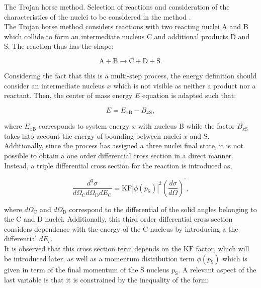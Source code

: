 \documentclass[openany]{book}
\begin{document}
The Trojan horse method. Selection of reactions and consideration of the characteristics of the nuclei to be considered in the method \cite{spitaleri_mukhamedzhanov_blokhintsev_cognata_pizzone_tumino_2011}. \\

The Trojan horse method considers reactions with two reacting nuclei A and B which collide to form an intermediate nucleus C and additional products D and S. The reaction thus has the shape:

\begin{equation}\label{eq:special_THM_reaction}
	\mathrm{A + B \rightarrow C + D + S}.
\end{equation}

Considering the fact that this is a multi-step process, the energy definition should consider an intermediate nucleus $x$ which is not visible as neither a product nor a reactant. Then, the center of mass energy $E$ equation is adapted such that: 

\begin{equation}\label{eq:special_THM_energy}
	E = E_{x\mathrm{B}} - B_{x\mathrm{S}},
\end{equation}

where $E_{x\mathrm{B}}$ corresponds to system energy $x$ with nucleus B while the factor $B_{x\mathrm{S}}$ takes into account the energy of bounding between nuclei $x$ and S.  \\

Additionally, since the process has assigned a three nuclei final state, it is not possible to obtain a one order differential cross section in a direct manner. Instead, a triple differential cross section for the reaction is introduced as, 

\begin{equation}\label{eq:special_THM_triple differential}
	\frac{d^3\sigma }{d\Omega_{\mathrm{C}} d\Omega_{\mathrm{D}} dE_\mathrm{C}} = \mathrm{KF} |\phi(p_\mathrm{S})|^2 \left(  \frac{d\sigma}{d\Omega}\right)^{'},
\end{equation}

where $d\Omega_\mathrm{C}$ and $d\Omega_\mathrm{D}$ correspond to the differential of the solid angles belonging to the C and D nuclei. Additionally, this third order differential cross section considers dependence with the energy of the C nucleus by introducing a the differential $dE_c$. \\ 

It is observed that this cross section term depends on the $\mathrm{KF}$ factor, which will be introduced later, as well as a momentum distribution term $\phi(p_\mathrm{S})$ which is given in term of the final momentum of the S nucleus $p_\mathrm{S}$. A relevant aspect of the last variable is that it is constrained by the inequality of the form:
\end{document}
